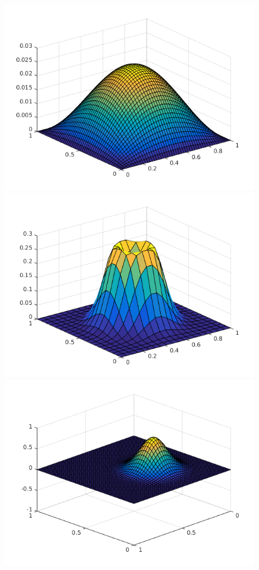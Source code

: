 \begin{figure}
\includegraphics[scale=0.33]{images/heatP4T01.png}
\includegraphics[scale=0.33]{images/waveP4T01.png}
\includegraphics[scale=0.33]{images/transpP4T01.png}

\end{figure}
